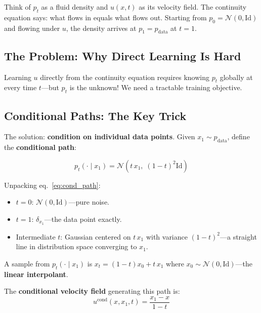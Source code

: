 \documentclass[11pt, a4paper]{article}
\newcommand{\Id}{\mathrm{Id}}
\newcommand{\pdata}{p_{\mathrm{data}}}
\theoremstyle{plain}
\theoremstyle{definition}
\theoremstyle{remark}
\begin{document}
\begin{intubox}
Think of $p_t$ as a fluid density and $u(x,t)$ as its velocity field. The continuity equation says: what flows in equals what flows out. Starting from $p_0 = \mathcal{N}(0,\Id)$ and flowing under $u$, the density arrives at $p_1 = \pdata$ at $t=1$.
\end{intubox}

\subsection{The Problem: Why Direct Learning Is Hard}

Learning $u$ directly from the continuity equation requires knowing $p_t$ globally at every time $t$---but $p_t$ is the unknown! We need a tractable training objective.

\subsection{Conditional Paths: The Key Trick}

The solution: \textbf{condition on individual data points}. Given $x_1 \sim \pdata$, define the \textbf{conditional path}:

\begin{thmbox}
\begin{equation}
  p_t(\cdot \mid x_1) = \mathcal{N}(t\,x_1,\; (1-t)^2 \Id)
  \label{eq:cond_path}
\end{equation}
\end{thmbox}

\begin{intubox}
Unpacking eq.~\eqref{eq:cond_path}:
\begin{itemize}
  \item $t=0$: $\mathcal{N}(0, \Id)$---pure noise.
  \item $t=1$: $\delta_{x_1}$---the data point exactly.
  \item Intermediate $t$: Gaussian centered on $t\,x_1$ with variance $(1-t)^2$---a straight line in distribution space converging to $x_1$.
\end{itemize}
A sample from $p_t(\cdot \mid x_1)$ is $x_t = (1-t)x_0 + t\,x_1$ where $x_0 \sim \mathcal{N}(0,\Id)$---the \textbf{linear interpolant}.
\end{intubox}

The \textbf{conditional velocity field} generating this path is:
\begin{equation}
  u^{\mathrm{cond}}(x, x_1, t) = \frac{x_1 - x}{1-t}
  \label{eq:cond_vel}
\end{equation}
\end{document}
